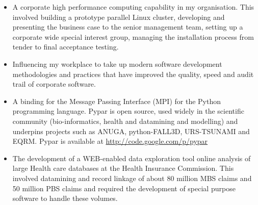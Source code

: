 \documentclass[11pt,a4paper]{article}
\begin{document}
\begin{itemize}
  \item A corporate high performance computing capability in my organisation.
  This involved building a prototype parallel Linux cluster, developing and presenting the business case to the
  senior management team, setting up a corporate wide special interest group, managing the installation process
  from tender to final acceptance testing.
  \item Influencing my workplace to take up modern software development methodologies and practices that
  have improved the quality, speed and audit trail of corporate software.
  \item A binding for the Message Passing Interface (MPI) for the Python programming language.
  Pypar is open source, used widely in the scientific community (bio-informatics, health and datamining and modelling) and underpins projects such as ANUGA, python-FALL3D, URS-TSUNAMI and EQRM.
  Pypar is available at \url{http://code.google.com/p/pypar}
  \item The development of a WEB-enabled
  data exploration tool online analysis of large Health care databases
  at the Health Insurance Commission. This involved datamining and record linkage of about 80 million
  MBS claims and 50 million PBS claims and required the development of special purpose software to
  handle these volumes.

\end{itemize}
\end{document}
